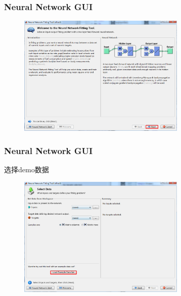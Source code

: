 \documentclass[slidestop,compress,mathserif,c]{beamer}
\begin{document}
\begin{frame}
\frametitle{Neural Network GUI}

\begin{figure}
\centering
\includegraphics[width=8cm]{2}
\end{figure}


\end{frame}


\begin{frame}
\frametitle{Neural Network GUI}
选择demo数据
\begin{figure}
\centering
\includegraphics[width=8cm]{3}
\end{figure}


\end{frame}
\end{document}
